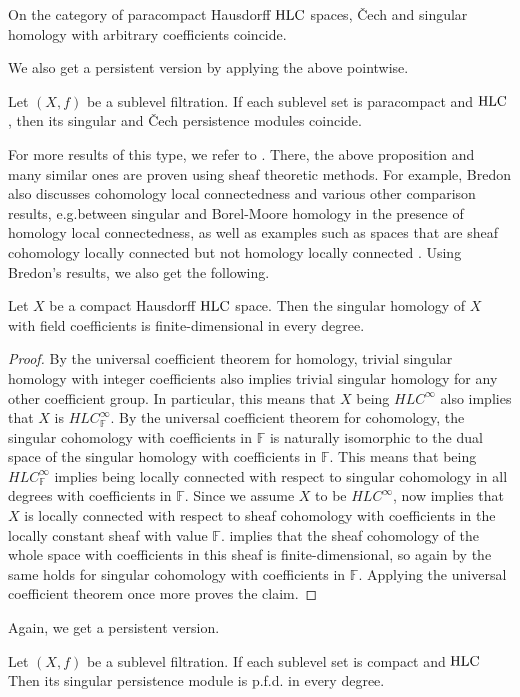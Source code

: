 \begin{prop}[{\cite{MR105677, MR1481706}}]\label{prop:cech_sing_hom_hlc}
	On the category of paracompact Hausdorff $\mathrm{HLC}$ spaces, \v{C}ech and singular homology with arbitrary coefficients coincide.
\end{prop}

We also get a persistent version by applying the above pointwise.

\begin{cor}\label{cor:cech_sing_persistent_iso}
	Let $(X, f)$ be a sublevel filtration. If each sublevel set is paracompact and $\mathrm{HLC}$, then its singular and \v{C}ech persistence modules coincide.
\end{cor}

For more results of this type, we refer to \cite{MR1481706}. There, the above proposition \cite[Corollary VI.12.6]{MR1481706} and many similar ones are proven using sheaf theoretic methods.
For example, Bredon also discusses cohomology local connectedness \cite[Section II.17]{MR1481706} and various other comparison results, e.g.\@ between singular and Borel-Moore homology \cite[Corollary V.12.15]{MR1481706} in the presence of homology local connectedness, as well as examples such as spaces that are sheaf cohomology locally connected but not homology locally connected \cite[Example II.17.12]{MR1481706}.
Using Bredon's results, we also get the following.

\begin{prop} \label{prop:fin_dim_sing_hom}
	Let $X$ be a compact Hausdorff $\mathrm{HLC}$ space.
	Then the singular homology of $X$ with field coefficients is finite-dimensional in every degree.
\end{prop}
\begin{proof}
	By the universal coefficient theorem for homology, trivial singular homology with integer coefficients also implies trivial singular homology for any other coefficient group. In particular, this means that $X$ being $HLC^{\infty}$ also implies that $X$ is $HLC^{\infty}_{\mathbb{F}}$. By the universal coefficient theorem for cohomology, the singular cohomology with coefficients in $\mathbb{F}$ is naturally isomorphic to the dual space of the singular homology with coefficients in $\mathbb{F}$. This means that being $HLC^{\infty}_{\mathbb{F}}$ implies being locally connected with respect to singular cohomology in all degrees with coefficients in $\mathbb{F}$. Since we assume $X$ to be $HLC^{\infty}$, \cite[Theorem III.1.1]{MR1481706} now implies that $X$ is locally connected with respect to sheaf cohomology with coefficients in the locally constant sheaf with value $\mathbb{F}$. \cite[Corollary II.17.7]{MR1481706} implies that the sheaf cohomology of the whole space with coefficients in this sheaf is finite-dimensional, so again by \cite[Theorem III.1.1]{MR1481706} the same holds for singular cohomology with coefficients in $\mathbb{F}$. Applying the universal coefficient theorem once more proves the claim.
\end{proof}

Again, we get a persistent version.

\begin{cor}
	Let $(X, f)$ be a sublevel filtration. If each sublevel set is compact and $\mathrm{HLC}$
	Then its singular persistence module is p.f.d. in every degree.
\end{cor}
